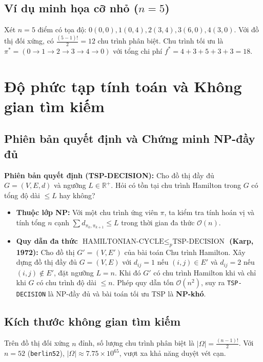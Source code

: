 \documentclass[12pt,a4paper]{report}
\begin{document}
\section{Ví dụ minh họa cỡ nhỏ ($n=5$)}
Xét $n=5$ điểm có tọa độ: $0(0,0), 1(0,4), 2(3,4), 3(6,0), 4(3,0)$. Với đồ thị đối xứng, có $\frac{(5-1)!}{2} = 12$ chu trình phân biệt. Chu trình tối ưu là $\pi^* = (0 \to 1 \to 2 \to 3 \to 4 \to 0)$ với tổng chi phí $f^* = 4 + 3 + 5 + 3 + 3 = 18$.

\chapter{Độ phức tạp tính toán và Không gian tìm kiếm}

\section{Phiên bản quyết định và Chứng minh NP-đầy đủ}
\textbf{Phiên bản quyết định (TSP-DECISION):} Cho đồ thị đầy đủ $G=(V,E,d)$ và ngưỡng $L \in \mathbb{R}^+$. Hỏi có tồn tại chu trình Hamilton trong $G$ có tổng độ dài $\le L$ hay không?

\begin{itemize}
    \item \textbf{Thuộc lớp NP:} Với một chu trình ứng viên $\pi$, ta kiểm tra tính hoán vị và tính tổng $n$ cạnh $\sum d_{\pi_k, \pi_{k+1}} \le L$ trong thời gian đa thức $\mathcal{O}(n)$.
    \item \textbf{Quy dẫn đa thức $\text{HAMILTONIAN-CYCLE} \le_p \text{TSP-DECISION}$ (Karp, 1972):} Cho đồ thị $G'=(V,E')$ của bài toán Chu trình Hamilton. Xây dựng đồ thị đầy đủ $G=(V,E)$ với $d_{ij} = 1$ nếu $(i,j)\in E'$ và $d_{ij} = 2$ nếu $(i,j)\notin E'$, đặt ngưỡng $L = n$. Khi đó $G'$ có chu trình Hamilton khi và chỉ khi $G$ có chu trình độ dài $\le n$. Phép quy dẫn tốn $\mathcal{O}(n^2)$, suy ra \texttt{TSP-DECISION} là NP-đầy đủ và bài toán tối ưu TSP là \textbf{NP-khó}.
\end{itemize}

\section{Kích thước không gian tìm kiếm}
Trên đồ thị đối xứng $n$ đỉnh, số lượng chu trình phân biệt là $|\Omega| = \frac{(n-1)!}{2}$. Với $n=52$ (\texttt{berlin52}), $|\Omega| \approx 7.75 \times 10^{65}$, vượt xa khả năng duyệt vét cạn.

\end{document}
